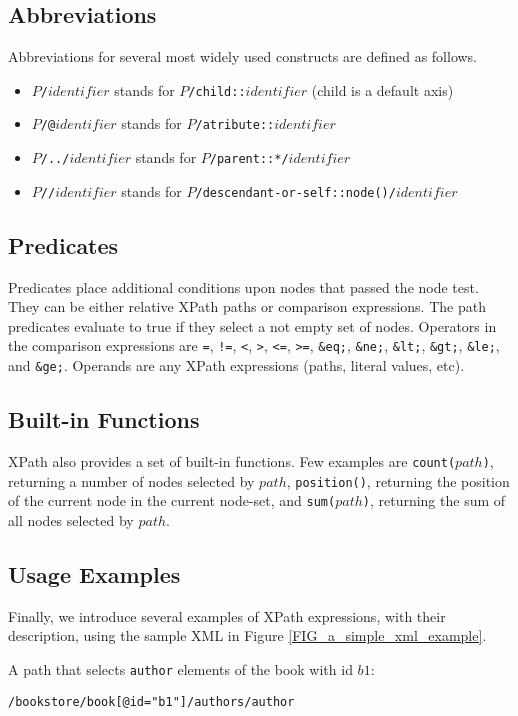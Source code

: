 \subsection{Abbreviations}
Abbreviations for several most widely used constructs are defined as follows.
\begin{itemize}
\item \texttt{$P$/$identifier$} stands for \texttt{$P$/child::$identifier$} (child is a default axis)
\item \texttt{$P$/@$identifier$} stands for \texttt{$P$/atribute::$identifier$}
\item \texttt{$P$/../$identifier$} stands for \texttt{$P$/parent::*/$identifier$}
\item \texttt{$P$//$identifier$} stands for \texttt{$P$/descendant-or-self::node()/$identifier$} 
\end{itemize}

\subsection{Predicates}
Predicates place additional conditions upon nodes that passed the node test. They can be either relative XPath paths or comparison expressions. The path predicates evaluate to true if they select a not empty set of nodes. Operators in the comparison expressions are \texttt{=}, \texttt{!=}, \texttt{<}, \texttt{>}, \texttt{<=}, \texttt{>=}, \texttt{\&eq;}, \texttt{\&ne;}, \texttt{\&lt;}, \texttt{\&gt;}, \texttt{\&le;}, and \texttt{\&ge;}. Operands are any XPath expressions (paths, literal values, etc).

\subsection{Built-in Functions}
XPath also provides a set of built-in functions. Few examples are \texttt{count($path$)}, returning a number of nodes selected by $path$, \texttt{position()}, returning the position of the current node in the current node-set, and \texttt{sum($path$)}, returning the sum of all nodes selected by $path$.

\subsection{Usage Examples}
Finally, we introduce several examples of XPath expressions, with their description, using the sample XML in Figure \ref{FIG_a_simple_xml_example}.

A path that selects \texttt{author} elements of the book with id $b1$:
\begin{alltt}
/bookstore/book[@id = "b1"]/authors/author
\end{alltt}

